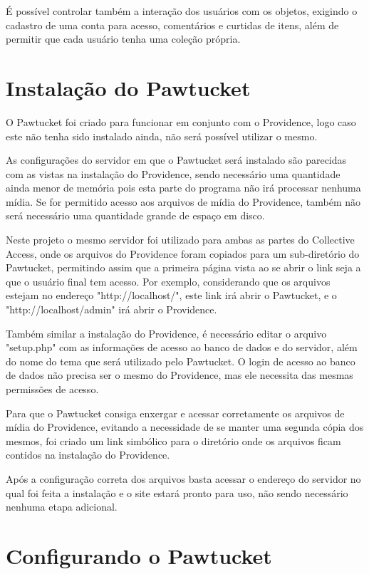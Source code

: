 \documentclass[a4paper,12pt,oneside,onecolumn,final,fleqn]{repUERJ}
\begin{document}
É possível controlar também a interação dos usuários com os objetos, exigindo o cadastro de uma conta para acesso, comentários e curtidas de itens, além de permitir que cada usuário tenha uma coleção própria.

\section{Instalação do Pawtucket}

O Pawtucket foi criado para funcionar em conjunto com o Providence, logo caso este não tenha sido instalado ainda, não será possível utilizar o mesmo.

As configurações do servidor em que o Pawtucket será instalado são parecidas com as vistas na instalação do Providence, sendo necessário uma quantidade ainda menor de memória pois esta parte do programa não irá processar nenhuma mídia. Se for permitido acesso aos arquivos de mídia do Providence, também não será necessário uma quantidade grande de espaço em disco.

Neste projeto o mesmo servidor foi utilizado para ambas as partes do Collective Access, onde os arquivos do Providence foram copiados para um sub-diretório do Pawtucket, permitindo assim que a primeira página vista ao se abrir o link seja a que o usuário final tem acesso. Por exemplo, considerando que os arquivos estejam no endereço "http://localhost/", este link irá abrir o Pawtucket, e o "http://localhost/admin" irá abrir o Providence.

Também similar a instalação do Providence, é necessário editar o arquivo "setup.php" com as informações de acesso ao banco de dados e do servidor, além do nome do tema que será utilizado pelo Pawtucket. O login de acesso ao banco de dados não precisa ser o mesmo do Providence, mas ele necessita das mesmas permissões de acesso.

Para que o Pawtucket consiga enxergar e acessar corretamente os arquivos de mídia do Providence, evitando a necessidade de se manter uma segunda cópia dos mesmos, foi criado um link simbólico para o diretório onde os arquivos ficam contidos na instalação do Providence.

Após a configuração correta dos arquivos basta acessar o endereço do servidor no qual foi feita a instalação e o site estará pronto para uso, não sendo necessário nenhuma etapa adicional.

\section{Configurando o Pawtucket}
\end{document}
